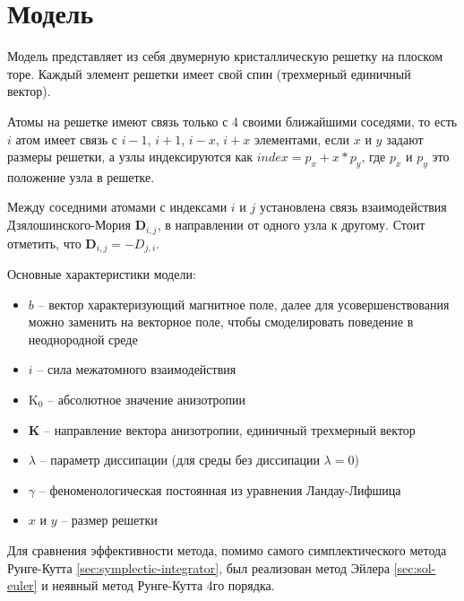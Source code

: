\section{Модель}\label{sec:model}

Модель представляет из себя двумерную кристаллическую решетку на плоском
торе. Каждый элемент решетки имеет свой спин (трехмерный единичный вектор).

Атомы на решетке имеют связь только с 4 своими ближайшими соседями,
то есть $i$ атом имеет связь с $i-1$, $i+1$, $i-x$, $i+x$ элементами,
если $x$ и $y$ задают размеры решетки, а узлы индексируются как
$index = p_x + x*p_y$, где $p_x$ и $p_y$ это положение
узла в решетке.

Между соседними атомами с индексами $i$ и $j$ установлена связь взаимодействия
Дзялошинского-Мория $\mathbf D_{i,j}$, в направлении от одного узла к другому.
Стоит отметить, что $\mathbf D_{i,j} = -D_{j,i}$.

Основные характеристики модели:
\begin{itemize}
\item $b$ -- вектор характеризующий магнитное поле, далее для
    усовершенствования можно заменить на векторное поле, чтобы смоделировать
    поведение в неоднородной среде
\item $i$ -- сила межатомного взаимодействия
\item $\mathrm{K_0}$ -- абсолютное значение анизотропии
\item $\mathbf K$ -- направление вектора анизотропии, единичный трехмерный вектор
\item $\lambda$ -- параметр диссипации (для среды без диссипации $\lambda=0$)
\item $\gamma$ -- феноменологическая постоянная из уравнения Ландау-Лифшица
\item $x$ и $y$ -- размер решетки
\end{itemize}

Для сравнения эффективности метода, помимо самого симплектического метода
Рунге-Кутта \ref{sec:symplectic-integrator}, был реализован метод Эйлера
\ref{sec:sol-euler} и неявный метод Рунге-Кутта 4го порядка.

